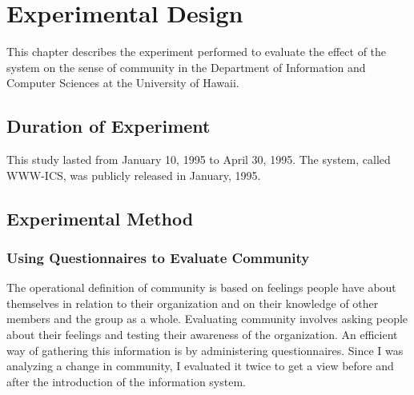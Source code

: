 
\chapter{Experimental Design}
\label{chap:experiment}

This chapter describes the experiment performed to evaluate the effect of the
system on the sense of community in the Department of Information and Computer
Sciences at the University of Hawaii.

\section{Duration of Experiment}
This study lasted from January 10, 1995 to April 30, 1995.  The system, called
WWW-ICS, was publicly released in January, 1995.

\section{Experimental Method}



\subsection{Using Questionnaires to Evaluate Community}
The operational definition of community is based on feelings people have about
themselves in relation to their organization and on their knowledge of other
members and the group as a whole.  Evaluating community involves asking people
about their feelings and testing their awareness of the organization.  An
efficient way of gathering this information is by administering questionnaires.
Since I was analyzing a change in community, I evaluated it twice to get a view
before and after the introduction of the information system.

